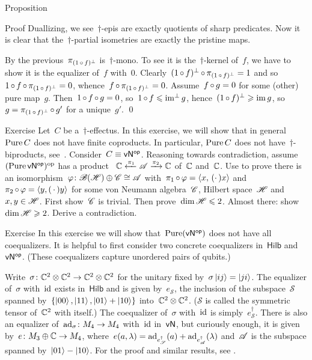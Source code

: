 \documentclass[b]{subfiles}
\begin{document}
\begin{parsec}
\begin{point}{Proposition}
\begin{point}{Proof}
Duallizing, we see~$\dagger$-epis are exactly quotients of sharp predicates.
Now it is clear that the~$\dagger$-partial isometries
are exactly the pristine maps.
\begin{point}%
By the previous~$\pi_{(1 \mathop{\circ} f)^\perp}$ is~$\dagger$-mono.
To see it is the~$\dagger$-kernel of~$f$,
we have to show it is the equalizer of~$f$ with~$0$.
Clearly~$(1 \mathop{\circ} f )^\perp \mathop{\circ} \pi_{(1 \mathop{\circ} f)^\perp} = 1$
and so~$1 \mathop{\circ} f \mathop{\circ} \pi_{(1 \mathop{\circ} f)^\perp} = 0$,
whence~$f \mathop{\circ} \pi_{(1 \mathop{\circ} f)^\perp} = 0$.
Assume~$f \mathop{\circ} g = 0$ for some (other) pure map~$g$.
Then~$1 \mathop{\circ} f \mathop{\circ} g = 0$,
    so~$1 \mathop{\circ} f \leqslant \operatorname{im^\perp} g$,
    hence~$(1 \mathop{\circ} f)^\perp \geqslant \operatorname{im} g$,
    so~$g = \pi_{(1 \mathop{\circ} f)^\perp} \mathop{\circ} g'$
    for a unique~$g'$. \qed
\end{point}
\end{point}
\end{point}
\begin{point}{Exercise}%
Let~$C$ be a~$\dagger$-effectus.
In this exercise, we will show that
    in general $\operatorname{Pure} C$
    does not have finite coproducts.
In particular, $\operatorname{Pure} C$ does not have~$\dagger$-biproducts,
    see~\cite[3.2.15]{heunenphd}.
Consider~$C \equiv {\mathsf{vN}}{^{\mathsf{op}}}$.
Reasoning towards contradiction,
    assume~$(\operatorname{Pure} {\mathsf{vN}}{^{\mathsf{op}}})^{\mathrm{op}}$
    has a product~$\ \C \xleftarrow{\pi_1} \scrA \xrightarrow{\pi_2} \C$
    of~$\mathbb{C} $ and~$\mathbb{C}$.
Use \TODO{}
    to prove there is an
    isomorphism~$\varphi\colon  \mathscr{B}(\mathscr{H}) \oplus \mathscr{C} \cong \mathscr{A}$
    with~$\pi_1 \mathop{\circ} \varphi = \left<x,\,(\cdot\,)x\right>$
    and~$\pi_2 \mathop{\circ} \varphi = \left<y,(\,\cdot\,)y\right>$
    for some von Neumann algebra~$\mathscr{C}$,
    Hilbert space~$\mathscr{H}$ and $x,y \in \mathscr{H}$.
    First show~$\mathscr{C}$ is trivial.
    Then prove~$\dim \mathscr{H} \leqslant 2$.
    Almost there: show~$\dim \mathscr{H} \geqslant 2$.
    Derive a contradiction.
\end{point}
\begin{point}{Exercise}%
In this exercise we will show that~$\operatorname{Pure}({\mathsf{vN}}{^{\mathsf{op}}})$ does not have
    all coequalizers.  It is helpful to first consider
    two concrete coequalizers in~$\mathsf{Hilb}$ and~${\mathsf{vN}}{^{\mathsf{op}}}$.
(These coequalizers capture unordered pairs of qubits.)

Write~$\sigma\colon \mathbb{C}^2 \otimes \mathbb{C}^2 \to \mathbb{C}^2 \otimes \mathbb{C}^2$
    for the unitary
    fixed by~$\sigma \ket{ij} = \ket{ji}$.
The equalizer of~$\sigma$ with~$\operatorname{id}$ exists in~$\mathsf{Hilb}$
    and is given by~$e_{\mathscr{S}}$, the inclusion
    of the subspace~$\mathscr{S}$
    spanned by~$\{\ket{00}, \ket{11}, \ket{01}+\ket{10}\}$
    into~$\mathbb{C}^2\otimes \mathbb{C}^2$.
    ($\mathscr{S}$ is called the symmetric tensor of~$\mathbb{C}^2$ with itself.)
    The coequalizer of~$\sigma$ with~$\operatorname{id}$ is simply~$e_{\mathscr{S}}^\dagger$.
    There is also an equalizer of~$\mathrm{ad}_{\sigma}\colon M_4 \to M_4$ with~$\operatorname{id}$
    in~$\mathsf{vN}$, but curiously enough, it is given
    by~$e \colon M_3 \oplus \mathbb{C} \to M_4$,
    where~$e(a,\lambda) =
            \mathrm{ad}_{e^\dagger_{\mathscr{S}}}(a) +
            \mathrm{ad}_{e^\dagger_{\mathscr{A}}}(\lambda)$
     and~$\mathscr{A}$ is the subspace spanned by~$\ket{01} - \ket{10}$.
     For the proof and similar results, see \cite{bags}.


\end{point}
\end{parsec}
\end{document}
